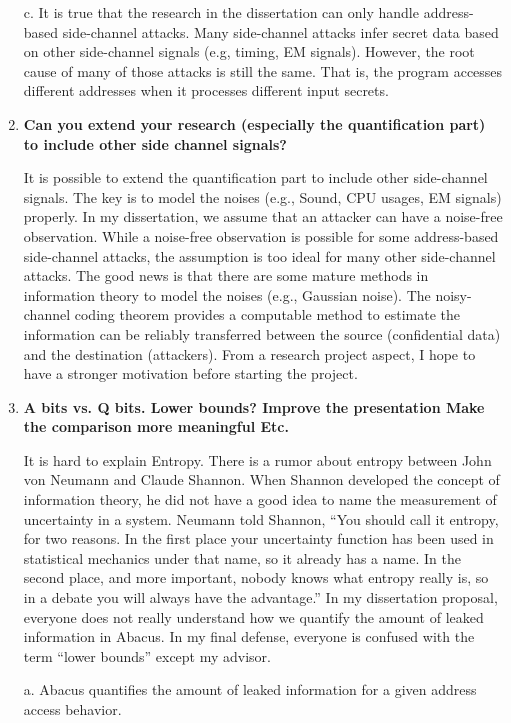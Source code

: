 \documentclass{article}
\begin{document}
\begin{enumerate}
c. It is true that the research in the dissertation can only handle address-based side-channel attacks. Many side-channel attacks infer secret data based on other side-channel signals (e.g, timing, EM signals). However, the root cause of many of those attacks is still the same. That is, the program accesses different addresses when it processes different input secrets.

\item \textbf{Can you extend your research (especially the quantification part) to include other side channel signals?}

It is possible to extend the quantification part to include other side-channel signals. The key is to model the noises (e.g., Sound, CPU usages, EM signals) properly. In my dissertation, we assume that an attacker can have a noise-free observation. While a noise-free observation is possible for some address-based side-channel attacks, the assumption is too ideal for many other side-channel attacks. The good news is that there are some mature methods in information theory to model the noises (e.g., Gaussian noise). The noisy-channel coding theorem provides a computable method to estimate the information can be reliably transferred between the source (confidential data) and the destination (attackers). From a research project aspect, I hope to have a stronger motivation before starting the project. 
\item \textbf{A bits vs. Q bits. Lower bounds?
       Improve the presentation
       Make the comparison more meaningful
       Etc.}

It is hard to explain Entropy. There is a rumor about entropy between John von Neumann and Claude Shannon. When Shannon developed the concept of information theory, he did not have a good idea to name the measurement of uncertainty in a system. Neumann told Shannon, ``You should call it entropy, for two reasons. In the first place your uncertainty function has been used in statistical mechanics under that name, so it already has a name. In the second place, and more important, nobody knows what entropy really is, so in a debate you will always have the advantage.'' In my dissertation proposal, everyone does not really understand how we quantify the amount of leaked information in Abacus. In my final defense, everyone is confused with the term ``lower bounds'' except my advisor. 

a. Abacus quantifies the amount of leaked information for a given address access behavior.


\end{enumerate}
\end{document}
